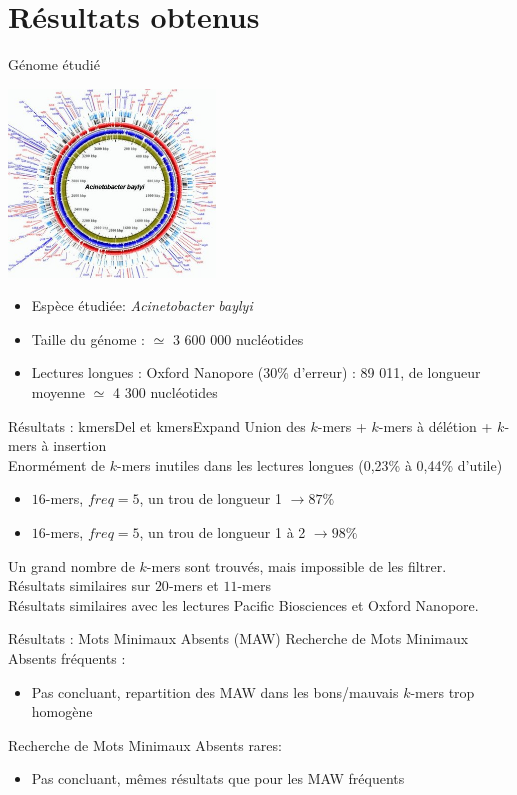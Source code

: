 \documentclass[11pt]{beamer}
\begin{document}
\section{Résultats obtenus}
\begin{frame}[fragile]{Génome étudié}
  \begin{center}
    \includegraphics[height=50mm]{acineto}
  \end{center}
  \begin{itemize}[<+-| alert@+>]
    \item Espèce étudiée: \textit{Acinetobacter baylyi}
    \item Taille du génome : $\simeq$ 3 600 000 nucléotides
    \item Lectures longues : Oxford Nanopore (30\% d'erreur) : 89 011, de longueur moyenne $\simeq$ 4 300 nucléotides
  \end{itemize}
\end{frame}
\begin{frame}[fragile]{Résultats : kmersDel et kmersExpand}
  Union des $\textit{k}$-mers + $\textit{k}$-mers à délétion + $\textit{k}$-mers à insertion\medskip\\\pause
  Enormément de $k$-mers inutiles dans les lectures longues (0,23\% à 0,44\% d'utile)\pause
  \begin{itemize}[<+-| alert@+>]
    \item $16$-mers, $freq = 5$, un trou de longueur 1 $\rightarrow 87\%$
    \item $16$-mers, $freq = 5$, un trou de longueur 1 à 2 $\rightarrow 98\%$
  \end{itemize}
  \pause
  Un grand nombre de $\textit{k}$-mers sont trouvés, mais impossible de les filtrer.\medskip\pause\\
  Résultats similaires sur $20$-mers et $11$-mers\medskip\pause\\
  Résultats similaires avec les lectures Pacific Biosciences et Oxford Nanopore.
\end{frame}

\begin{frame}[fragile]{Résultats : Mots Minimaux Absents (MAW)}
  Recherche de Mots Minimaux Absents fréquents :\pause
  \begin{itemize}
    \item Pas concluant, repartition des MAW dans les bons/mauvais $k$-mers trop homogène
  \end{itemize}\pause
  Recherche de Mots Minimaux Absents rares:\pause
  \begin{itemize}
    \item Pas concluant, mêmes résultats que pour les MAW fréquents
  \end{itemize}
\end{frame}
\end{document}
